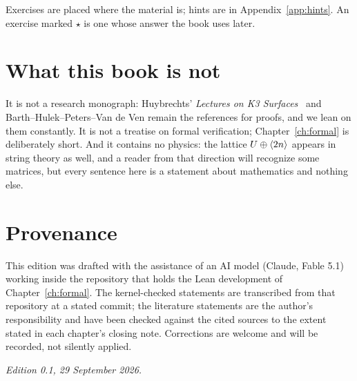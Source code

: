 Exercises are placed where the material is; hints are in
Appendix~\ref{app:hints}. An exercise marked $\star$ is one whose answer the
book uses later.

\section*{What this book is not}

It is not a research monograph: Huybrechts' \emph{Lectures on K3
Surfaces}~\cite{Huybrechts2016} and Barth--Hulek--Peters--Van de Ven
\cite{BHPV2004} remain the references for proofs, and we lean on them
constantly. It is not a treatise on formal verification; Chapter~\ref{ch:formal}
is deliberately short. And it contains no physics: the lattice
$U\oplus\langle 2n\rangle$ appears in string theory as well, and a reader from that
direction will recognize some matrices, but every sentence here is a
statement about mathematics and nothing else.

\section*{Provenance}

This edition was drafted with the assistance of an AI model (Claude, Fable
5.1) working inside the repository that holds the Lean development of
Chapter~\ref{ch:formal}. The kernel-checked statements are transcribed from
that repository at a stated commit; the literature statements are the
author's responsibility and have been checked against the cited sources to the
extent stated in each chapter's closing note. Corrections are welcome and
will be recorded, not silently applied.

\bigskip
\noindent\textit{Edition 0.1, 29 September 2026.}
